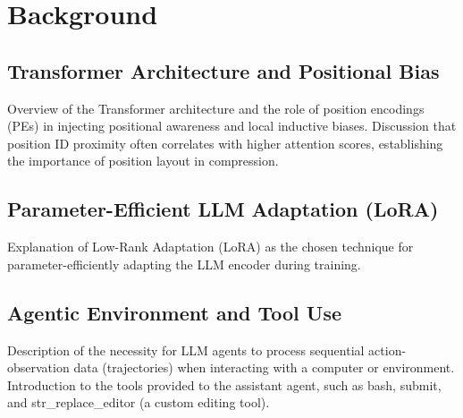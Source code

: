\chapter{Background}


\section{Transformer Architecture and Positional Bias}

Overview of the Transformer architecture and the role of position encodings (PEs) in injecting positional awareness and local inductive biases.
Discussion that position ID proximity often correlates with higher attention scores, establishing the importance of position layout in compression.

% 


\section{Parameter-Efficient LLM Adaptation (LoRA)}

Explanation of Low-Rank Adaptation (LoRA) as the chosen technique for parameter-efficiently adapting the LLM encoder during training.


\section{Agentic Environment and Tool Use}

Description of the necessity for LLM agents to process sequential action-observation data (trajectories) when interacting with a computer or environment.
Introduction to the tools provided to the assistant agent, such as bash, submit, and str\_replace\_editor (a custom editing tool).
